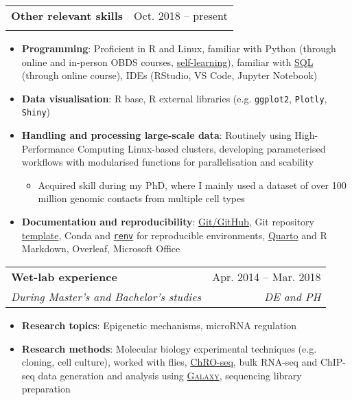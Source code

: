 \documentclass[legalpaper,11pt]{article}
\makeatletter
\newcommand{\resumeItem}[2]{
  \item\small{
    \textbf{#1}{: #2 \vspace{-2pt}}
  }
}
\newcommand{\resumeSubheading}[4]{
  \vspace{-1pt}\item
    \begin{tabular*}{0.97\textwidth}[t]{l@{\extracolsep{\fill}}r}
      \textbf{#1} & #2 \\
      \textit{\small#3} & \textit{\small #4} \\
    \end{tabular*}\vspace{-5pt}
}
\newcommand{\resumeItemListStart}{\begin{itemize}}
\newcommand{\resumeItemListEnd}{\end{itemize}\vspace{-5pt}}
\makeatother
\begin{document}
\newpage

        \resumeSubheading
        {Other relevant skills}{Oct. 2018 -- present}{}{}
            \resumeItemListStart
                \resumeItem{Programming}{Proficient in R and Linux, familiar with Python (through online and in-person OBDS courses, \href{https://github.com/liezeltamon/advent-of-code}{self-learning}), familiar with \href{https://learn.365datascience.com/certificates/CC-1C72E62035/}{SQL} (through online course), IDEs (RStudio, VS Code, Jupyter Notebook)}
            \resumeItemListEnd

            \resumeItemListStart
                \resumeItem{Data visualisation}{R base, R external libraries (e.g. \texttt{ggplot2}, \texttt{Plotly}, \texttt{Shiny})}
            \resumeItemListEnd
            
            \resumeItemListStart
                \resumeItem{Handling and processing large-scale data}{Routinely using High-Performance Computing Linux-based clusters, developing parameterised workflows with modularised functions for parallelisation and scability}
                    \begin{itemize}
                        \item {Acquired skill during my PhD, where I mainly used a dataset of over 100 million genomic contacts from multiple cell types}
                    \end{itemize}
                \resumeItem{Documentation and reproducibility}{{\href{https://github.com/liezeltamon}{Git/GitHub}}, Git repository \href{https://github.com/liezeltamon/project-template}{template}, Conda and \href{https://rstudio.github.io/renv/articles/renv.html}{\texttt{renv}} for reproducible environments, \href{https://quarto.org}{Quarto} and R Markdown, Overleaf, Microsoft Office}
                
            \resumeItemListEnd

        \resumeSubheading
        {Wet-lab experience}{Apr. 2014 -- Mar. 2018}{During Master's and Bachelor's studies}{DE and PH}
            \resumeItemListStart
                \resumeItem{Research topics}{Epigenetic mechanisms, microRNA regulation}
                \resumeItem{Research methods}{Molecular biology experimental techniques (e.g. cloning, cell culture), worked with flies, \href{https://www.nature.com/articles/s41588-018-0244-3#data-availability}{ChRO-seq}, bulk RNA-seq and ChIP-seq data generation and analysis using \href{https://usegalaxy.org/}{\textsc{Galaxy}}, sequencing library preparation}
            \resumeItemListEnd
        
\end{document}
